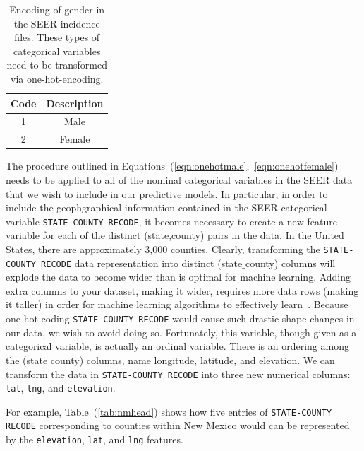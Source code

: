 \documentclass[a4paper,11pt]{article}
\newcommand{\code}[1]{\colorbox{light-gray}{\texttt{#1}}}
\begin{document}
\begin{table}[tbp]
\begin{center}
\begin{tabular}{|c|c|}
\hline
\rowcolors{1}{white}{yellow}
Code & Description \\ \hline
1 & Male \\  \hline
2 & Female \\  \hline
\end{tabular}
\caption{\label{tab:sex} Encoding of gender in the SEER incidence files. These types of categorical variables need to be transformed via one-hot-encoding.}
\end{center}
\end{table}


The procedure outlined in Equations~(\ref{eqn:onehotmale},~\ref{eqn:onehotfemale}) needs to be applied to all of the nominal categorical variables in the SEER data that we wish to include in our predictive models.
In particular, in order to include the geophgraphical information contained in the SEER categorical variable \code{STATE-COUNTY RECODE}, it becomes necessary to create a new feature variable for each of the distinct (state,county) pairs in the data. In the United States, there are approximately 3,000 counties. Clearly, transforming the \code{STATE-COUNTY RECODE} data representation into distinct (state$\_$county) columns will explode the data to become wider than is optimal for machine learning. Adding extra columns to your dataset, making it wider, requires more data rows (making it taller) in order for machine learning algorithms to effectively learn~\cite{bowles}. Because one-hot coding \code{STATE-COUNTY RECODE} would cause such drastic shape changes in our data, we wish to avoid doing so. Fortunately, this variable, though given as a categorical variable, is actually an ordinal variable. There is an ordering among the (state$\_$county) columns, name longitude, latitude, and elevation. We can transform the data in \code{STATE-COUNTY RECODE} into three new numerical columns: \code{lat}, \code{lng}, and \code{elevation}.

For example, Table~(\ref{tab:nmhead}) shows how five entries of \code{STATE-COUNTY RECODE} corresponding to counties within New Mexico would can be represented by the 
\code{elevation}, \code{lat}, and \code{lng} features.
\end{document}
